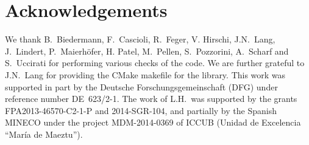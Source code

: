 \documentclass[preprint,sort&compress,12pt]{elsarticle}
\begin{document}
\section{Acknowledgements}
We thank B.~Biedermann, F.~Cascioli, R.~Feger, V. Hirschi, 
J.N.~Lang, J.~Lindert,
P.~Maierh\"ofer, H. Patel,
M.~Pellen, S.~Pozzorini, A.~Scharf and S.~Uccirati
for performing various checks of the code.  We are further grateful to
J.N.~Lang for providing the {\sc CMake} makefile for the library.
This work was supported in part by the Deutsche Forschungsgemeinschaft
(DFG) under reference number DE~623/2-1.  The work of L.H.\ was
supported by the grants FPA2013-46570-C2-1-P and 2014-SGR-104, and
partially by the Spanish MINECO under the project MDM-2014-0369 of
ICCUB (Unidad de Excelencia ``Mar\'ia de Maeztu'').

\appendix
\end{document}
